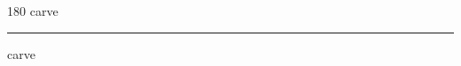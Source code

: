 
\begin{frame}
\begin{center}
\begin{turn}{180}
{\fontsize{2.5cm}{1em}\selectfont carve}
\end{turn}
\vspace{1em}\par  
\hrule
\vspace{1em}\par  
{\fontsize{2.5cm}{1em}\selectfont carve}
\end{center}
\end{frame}
